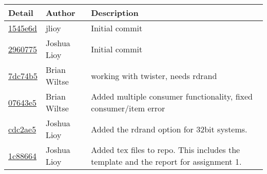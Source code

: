 \begin{tabular}{l l l}\textbf{Detail} & \textbf{Author} & \textbf{Description}\\\hline
\href{https://github.com/jlioy/group11repo/commit/1545e6d0da222412e8fa7eefd1a4cabe77a94c43}{1545e6d} & jlioy & Initial commit\\\hline
\href{https://github.com/jlioy/group11repo/commit/2960775caca5e9dca24141a3ed4fc61f799ec04b}{2960775} & Joshua Lioy & Initial commit\\\hline
\href{https://github.com/jlioy/group11repo/commit/7dc74b5a1b9a45379d309e0f2e220002ac19ce53}{7dc74b5} & Brian Wiltse & working with twister, needs rdrand\\\hline
\href{https://github.com/jlioy/group11repo/commit/07643e55d750324a3f677efa92d7c7fe53ec1c59}{07643e5} & Brian Wiltse & Added multiple consumer functionality, fixed consumer/item error\\\hline
\href{https://github.com/jlioy/group11repo/commit/cdc2ae515d4db42998bf527f9df655e20384c427}{cdc2ae5} & Joshua Lioy & Added the rdrand option for 32bit systems.\\\hline
\href{https://github.com/jlioy/group11repo/commit/1c8866445e7569af74bd8ecf7cd21490e5e38cea}{1c88664} & Joshua Lioy & Added tex files to repo. This includes the template and the report for assignment 1.\\\hline\end{tabular}
